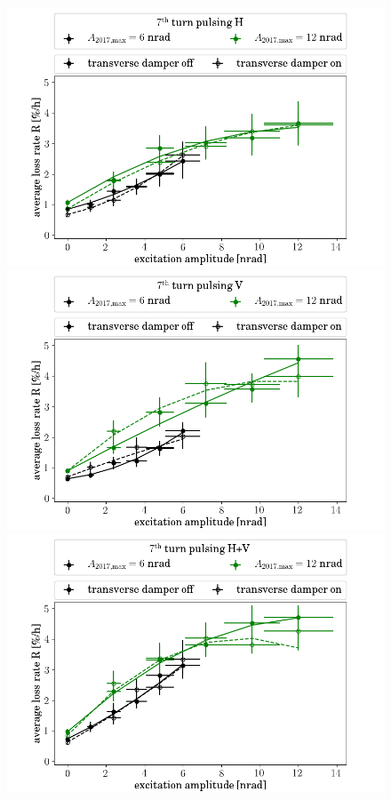 \documentclass[%
 reprint,
 amsmath,amssymb,
 aps,
prstab,
longbibliography
]{revtex4-1}
\begin{document}
\begin{figure}
	\begin{minipage}[t]{1.0\linewidth}
	\centering
	\includegraphics[width=0.9\linewidth]{2017_scale_amp_7h_lblshort.png}
	\end{minipage}
	\begin{minipage}[t]{1.0\linewidth}
		\centering
		\includegraphics[width=0.9\linewidth]{2017_scale_amp_7v_lblshort.png}
	\end{minipage}
	\begin{minipage}[t]{1.0\linewidth}
		\centering
		\includegraphics[width=0.9\linewidth]{2017_scale_amp_7hv_lblshort.png}

\end{minipage}
\end{figure}
\end{document}
